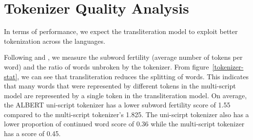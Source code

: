 \documentclass[11pt]{article}
\begin{document}
\section{Tokenizer Quality Analysis}
 In terms of performance, we expect the transliteration model to exploit better tokenization across the languages. 
\begin{figure*}[hbt!]
\begin{center}
\hfill
{}
\caption{Subword fertility (lower is better) and unbroken ratio (higher is better)\label{tokenizer-stat}  }
\end{center}
\end{figure*}
Following \citep{acs:2019} and \citep{rust-etal-2021-good}, we measure the subword fertility (average number of tokens per word) and the ratio of words unbroken by the tokenizer. From figure~\ref{tokenizer-stat}, we can see that transliteration reduces the splitting of words. This indicates that many words that were represented by different tokens in the multi-script model are represented by a single token in the transliteration model. On average, the ALBERT uni-script tokenizer has a lower subword fertility score of 1.55 compared to the multi-script tokenizer's 1.825. The uni-scirpt tokenizer also has a lower proportion of continued word score of 0.36 while the multi-script tokenizer has a score of 0.45.
\end{document}
